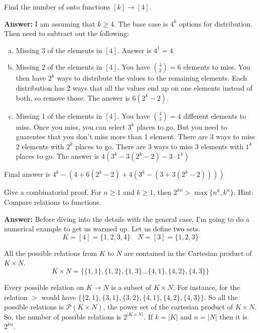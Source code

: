 \documentclass{article}
\begin{document}
\setcounter{problem}{6}
\begin{problem} %
Find the number of onto functions $[k] \rightarrow [4]$.
\end{problem}

\textbf{Answer:} I am assuming that $k \ge 4$. The base case is $4^k$ options for distribution. Then need to subtract out the following:
\begin{enumerate}[(a)]
    \item Missing 3 of the elements in $[4]$. Answer is $4^1 = 4$.
    \item Missing 2 of the elements in $[4]$. You have $\binom{4}{2} = 6$ elements to miss. You then have $2^k$ ways to distribute the values to the remaining elements. Each distribution has 2 ways that all the values end up on one elements instead of both, so remove those. The answer is $6(2^k - 2)$.
    \item Missing 1 of the elements in $[4]$. You have $\binom{4}{3}= 4$ different elements to miss. Once you miss, you can select $3^k$ places to go. But you need to guarentee that you don't miss more than 1 element. There are 3 ways to miss 2 elements with $2^k$ places to go. There are 3 ways to miss 3 elements with $1^k$ places to go. The answer is $4(3^k - 3 (2^k - 2) - 3 \cdot 1^k)$
\end{enumerate}

Final answer is $4^k - (4 + 6(2^k -2) + 4(3^k -(3 + 3( 2^k - 2))))$

\setcounter{problem}{10}
\begin{problem} %
Give a combinatorial proof. For $n \ge 1$ and $k \ge 1$, then $2^{kn} > \max \{n^k, k^n\}$. Hint: Compare relations to functions.
\end{problem}

\textbf{Answer:} Before diving into the details with the general case, I'm going to do a numerical example to get us warmed up. Let us define two sets.
\begin{equation*}
    K = [4] = \{1, 2, 3, 4\} \quad N = [3] = \{1, 2, 3\}
\end{equation*}

All the possible relations from $K$ to $N$ are contained in the Cartesian product of $K \times N$.
\begin{equation}
    K \times N = \{\{1,1\}, \{1, 2\}, \{1, 3\} \dots \{4, 1\}, \{4, 2\}, \{4, 3\}\}
\end{equation}

Every possible relation on $K \rightarrow N$ is a subset of $K \times N$. For instance, for the relation $>$ would have $\{\{2, 1\}, \{3, 1\}, \{3, 2\}, \{4, 1\}, \{4, 2\}, \{4, 3\}\}$. So all the possible relations is $\mathscr{P}(K \times N)$, the power set of the cartesian product of $K \times N$. So, the number of possible relations is $2^{|K \times N|}$. If $k = |K|$ and $n = |N|$ then it is $2^{kn}$.
\end{document}
